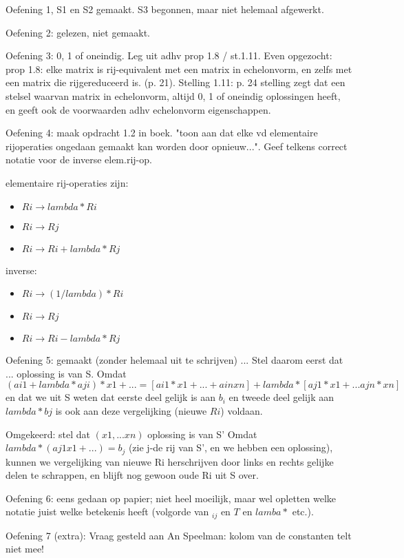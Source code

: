 \documentclass{article}
\begin{document}
Oefening 1, S1 en S2 gemaakt. S3 begonnen, maar niet helemaal afgewerkt.

Oefening 2: gelezen, niet gemaakt. 

Oefening 3: 0, 1 of oneindig. Leg uit adhv prop 1.8 / st.1.11. Even opgezocht: prop 1.8: elke matrix is rij-equivalent met een matrix in echelonvorm, en zelfs met een matrix die rijgereduceerd is. (p. 21). Stelling 1.11: p. 24
stelling zegt dat een stelsel waarvan matrix in echelonvorm, altijd 0, 1 of oneindig oplossingen heeft, en geeft ook de voorwaarden adhv echelonvorm eigenschappen. 

Oefening 4: maak opdracht 1.2 in boek. "toon aan dat  elke vd elementaire rijoperaties ongedaan gemaakt kan worden door opnieuw...". Geef telkens correct notatie voor de inverse elem.rij-op. 

elementaire rij-operaties zijn: 
\begin{itemize}
\item $Ri \rightarrow  lambda * Ri $
\item $Ri \rightarrow Rj$
\item $Ri \rightarrow Ri + lambda*Rj$
\end{itemize}

inverse: 
\begin{itemize}
\item $Ri \rightarrow  (1/lambda) * Ri $
\item $Ri \rightarrow Rj$
\item $Ri \rightarrow Ri - lambda*Rj$
\end{itemize}

Oefening 5: gemaakt (zonder helemaal uit te schrijven) 
...
Stel daarom eerst dat ... oplossing is van S. Omdat 
$
(ai1 + lambda*aji) * x1 + ... 
= 
[ ai1 * x1 + ... + ain xn  ] + lambda* [ aj1 * x1 + ... ajn * xn] $
en dat we uit S weten dat 
eerste deel gelijk is aan $b_i$ 
en tweede deel gelijk aan $lambda*bj$
is ook aan deze vergelijking (nieuwe $Ri$) voldaan. 

Omgekeerd: stel dat $(x1,...xn)$ oplossing is van S' 
Omdat $lambda*(aj1x1 + ...) = b_j $ (zie j-de rij van S', en we hebben een oplossing),
kunnen we vergelijking van nieuwe Ri herschrijven door links en rechts gelijke delen te schrappen,
en blijft nog gewoon oude Ri uit S over. 

Oefening 6: 
eens gedaan op papier; niet heel moeilijk, maar wel opletten welke notatie juist welke betekenis heeft (volgorde van $_{ij}$ en $T$ en $lamba*$ etc.). 

Oefening 7 (extra): 
Vraag gesteld aan An Speelman: kolom van de constanten telt niet mee! 
\end{document}
